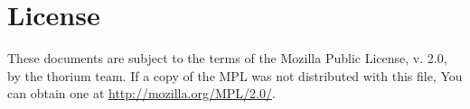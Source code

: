 \section*{License}
These documents are subject to the terms of the Mozilla Public
License, v. 2.0, by the thorium team. If a copy of the MPL was not distributed with this
file, You can obtain one at \url{http://mozilla.org/MPL/2.0/}.

